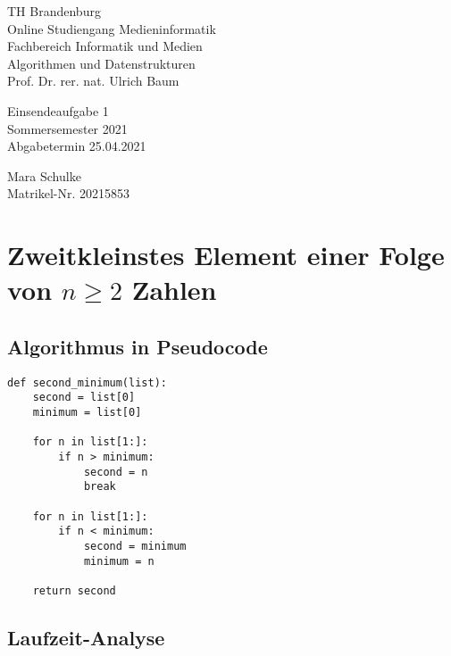 \documentclass{article}
\begin{document}
\begin{titlepage}
	\begin{flushleft}
		TH Brandenburg \\
		Online Studiengang Medieninformatik \\
		Fachbereich Informatik und Medien \\
		Algorithmen und Datenstrukturen \\
		Prof. Dr. rer. nat. Ulrich Baum
	\end{flushleft}

	\vfill

	\begin{center}
		\Large{Einsendeaufgabe 1}\\[0.5em]
		\large{Sommersemester 2021}\\[0.25em]
		\large{Abgabetermin 25.04.2021}
	\end{center}

	\vfill

	\begin{flushright}
		Mara Schulke \\
		Matrikel-Nr. 20215853
	\end{flushright}
\end{titlepage}

\newpage

\section{Zweitkleinstes Element einer Folge  von $n \geq 2$ Zahlen}

\subsection{Algorithmus in Pseudocode}

\begin{lstlisting}
def second_minimum(list):
    second = list[0]
    minimum = list[0]

    for n in list[1:]:
        if n > minimum:
            second = n
            break

    for n in list[1:]:
        if n < minimum:
            second = minimum
            minimum = n

    return second
\end{lstlisting}

\subsection{Laufzeit-Analyse}
\end{document}

